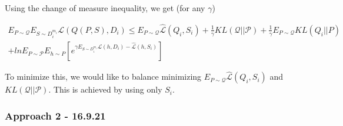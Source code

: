 \documentclass[letterpaper]{article}
\theoremstyle{definition}
\begin{document}
Using the change of measure inequality, we get (for any $\gamma$)

\begin{equation} \label{eq-base}
\begin{split}
E_{P\sim \mathcal{Q}}E_{S\sim D_i^{m_i}}\mathcal{L}(Q(P, S), D_i)\leq E_{P\sim \mathcal{Q}}\hat{\mathcal{L}}(Q_i, S_i)  + \frac{1}{\gamma}KL(\mathcal{Q}||\mathcal{P})+ \frac{1}{\gamma}E_{P\sim \mathcal{Q}}KL(Q_i||P)\\  +lnE_{P\sim \mathcal{P}}E_{h\sim P}\left [e^{\gamma E_{S\sim D_i^{m_i}}\mathcal{L}(h, D_i)-\hat{\mathcal{L}}(h, S_i)}\right ]
\end{split}
\end{equation}

To minimize this, we would like to balance minimizing $E_{P\sim \mathcal{Q}}\hat{\mathcal{L}}(Q_i, S_i)$ and $KL(\mathcal{Q}||\mathcal{P})$. This is achieved by using only $S_i$.






\subsubsection*{Approach 2 - 16.9.21} \label{section-meta-known}
\end{document}
